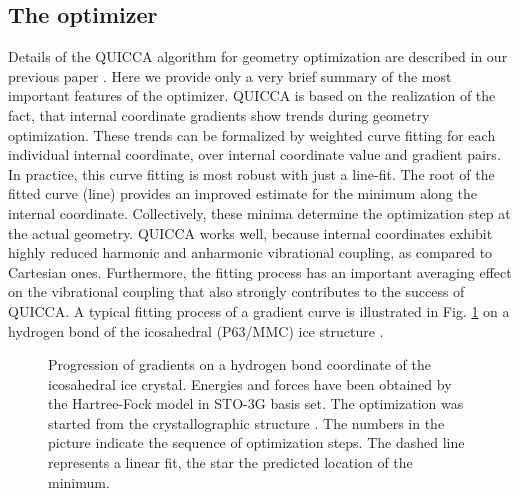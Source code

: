 \documentclass[prl,aps,preprint,superbib,12pt]{revtex4}
\begin{document}
\subsection{The optimizer}
Details of the QUICCA algorithm for geometry optimization are 
described in our previous paper \cite{KNemeth04}. Here we provide 
only a very brief summary of the most important features of the 
optimizer.
QUICCA is based on the realization of the fact, that internal coordinate
gradients show trends during geometry optimization.
These trends can be formalized by weighted curve fitting for each 
individual internal coordinate, over internal coordinate value and 
gradient pairs.
In practice, this curve fitting is most robust with just a line-fit. 
The root of the
fitted curve (line) provides an improved estimate for the minimum
along the internal coordinate. Collectively, these minima determine
the optimization step at the actual geometry.
QUICCA works well, because internal coordinates exhibit  
highly reduced harmonic and anharmonic vibrational coupling, as
compared to Cartesian ones. Furthermore, the fitting process
has an important averaging effect on the vibrational coupling
that also strongly contributes to the success of QUICCA.
A typical fitting process of a gradient curve is illustrated in 
Fig. \ref{iceIh} on a hydrogen bond of the icosahedral (P63/MMC)
ice structure \cite{AGoto90}.

\begin{figure}[h]
\caption{
Progression of gradients on a hydrogen bond coordinate
of the icosahedral ice crystal.
Energies and forces have been obtained by the Hartree-Fock
model in STO-3G basis set.
The optimization was started from the crystallographic structure
\cite{AGoto90}.
The numbers in the picture
indicate the sequence of optimization steps. The dashed line represents
a linear fit, the star the predicted location of the minimum.}
\label{iceIh}
\end{figure}
\end{document}
